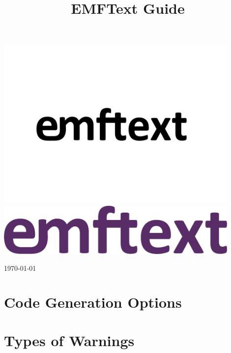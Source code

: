\documentclass[smallheadings,headsepline,pointlessnumbers,11pt,a4paper]{scrbook}
\title{EMFText Guide}
\newcommand{\changefont}[3]{\fontfamily{#1} \fontseries{#2} \fontshape{#3} \selectfont}
\let\origdoublepage\cleardoublepage
\renewcommand{\cleardoublepage}{%
  \clearpage{\pagestyle{empty}\origdoublepage}}
\begin{document}
\begin{titlepage}

\hbox{}
\vspace{4cm}

\begin{center}

\ifpdf
	\includegraphics[width=0.9\textwidth]{../latex/figures/EMFTextLogo.pdf}
\else
	\includegraphics[width=0.9\textwidth]{../latex/figures/EMFTextLogo.png}
\fi

\vspace{3cm}
{
\fontsize{40}{40}
\changefont{phv}{m}{n}{USER GUIDE}
}
\end{center}

\vspace{7cm}
\begin{flushright}
\large
\today
\end{flushright}

\end{titlepage}

\cleardoublepage

\tableofcontents

\mainmatter





\renewcommand{\listfigurename}{List of Figures}
\listoffigures
\cleardoublepage

\renewcommand{\lstlistlistingname}{List of Listings\vspace{3mm}}
\lstlistoflistings
\cleardoublepage

\begin{appendix}
\chapter{Code Generation Options}
\label{app:options}


\chapter{Types of Warnings}
\label{app:warnings}

\end{appendix}


\end{document}
